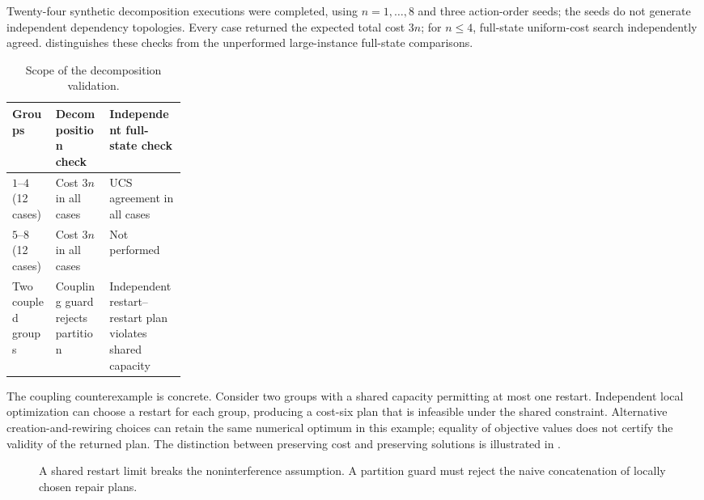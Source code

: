 \documentclass[11pt,a4paper]{article}
\begin{document}
Twenty-four synthetic decomposition executions were completed, using $n=1,\ldots,8$ and three action-order seeds; the seeds do not generate independent dependency topologies. Every case returned the expected total cost $3n$; for $n\le4$, full-state uniform-cost search independently agreed.  distinguishes these checks from the unperformed large-instance full-state comparisons.
\begin{table}[H]\centering\caption{Scope of the decomposition validation.}\label{tab:decomp}
\begin{tabularx}{\linewidth}{@{}p{0.25\linewidth}X X@{}}\toprule
Groups & Decomposition check & Independent full-state check\\\midrule
$1$--$4$ (12 cases) & Cost $3n$ in all cases & UCS agreement in all cases\\
$5$--$8$ (12 cases) & Cost $3n$ in all cases & Not performed\\
Two coupled groups & Coupling guard rejects partition & Independent restart--restart plan violates shared capacity\\\bottomrule
\end{tabularx}\end{table}

The coupling counterexample is concrete. Consider two groups with a shared capacity permitting at most one restart. Independent local optimization can choose a restart for each group, producing a cost-six plan that is infeasible under the shared constraint. Alternative creation-and-rewiring choices can retain the same numerical optimum in this example; equality of objective values does not certify the validity of the returned plan. The distinction between preserving cost and preserving solutions is illustrated in .
\begin{figure}[H]\centering
{}
\caption{A shared restart limit breaks the noninterference assumption. A partition guard must reject the naive concatenation of locally chosen repair plans.}\label{fig:coupling}
\end{figure}
\end{document}

